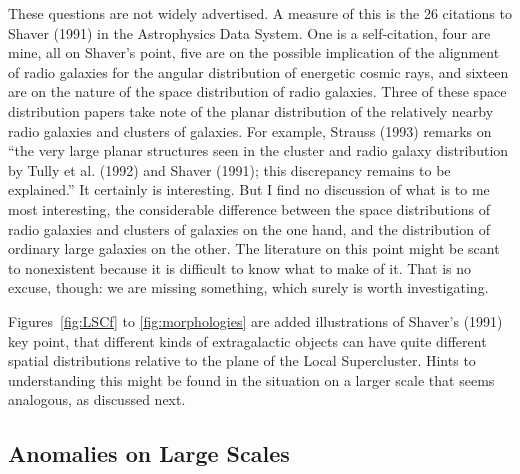 \documentclass[fleqn,12pt]{article}
\begin{document}
These questions are not widely advertised. A measure of this is the 26 citations to Shaver (1991) in the Astrophysics Data System. One is a self-citation, four are mine, all on Shaver's point, five are on the possible implication of the alignment of radio galaxies for the angular distribution of energetic cosmic rays, and sixteen are on the nature of the space distribution of radio galaxies. Three of these space distribution papers take note of the planar distribution of the relatively nearby radio galaxies and clusters of galaxies. For example, Strauss (1993) remarks on ``the very large planar structures seen in the cluster and radio galaxy distribution by Tully et al. (1992) and Shaver (1991); this discrepancy remains to be explained.''  It certainly is interesting. But I find no discussion of what is to me most interesting, the considerable difference between the space distributions of radio galaxies and clusters of galaxies on the one hand, and the distribution of ordinary large galaxies on the other. The literature on this point might be scant to nonexistent because it is difficult to know what to make of it. That is no excuse, though: we are missing something, which surely is worth investigating.

Figures~\ref{fig:LSCf} to \ref{fig:morphologies} are added illustrations of Shaver's (1991) key point, that different kinds of extragalactic objects can have quite different spatial distributions relative to the plane of the Local Supercluster. Hints to understanding this might be found in the situation on a larger scale that seems analogous, as discussed next. 

\subsection{Anomalies on Large Scales}\label{CosPrin}
\end{document}
